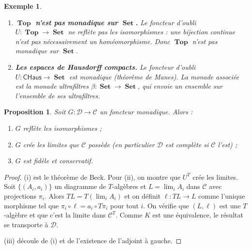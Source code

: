 \documentclass[a4paper,12pt]{book}
\DeclareMathOperator{\Set}{\mathbf{Set}}
\DeclareMathOperator{\Top}{\mathbf{Top}}
\newtheorem{proposition}[theoreme]{Proposition}
\newtheorem{exemple}[theoreme]{Exemple}
\begin{document}
\begin{exemple}\label{ex:non-monadique}
\begin{enumerate}[label=(\roman*)]
\item \textbf{$\Top$ n'est pas monadique sur $\Set$.}
    Le foncteur d'oubli $U \colon \Top \to \Set$ ne reflète pas
    les isomorphismes : une bijection continue n'est pas nécessairement
    un homéomorphisme. Donc $\Top$ n'est pas monadique sur $\Set$.

\item \textbf{Les espaces de Hausdorff compacts.}
    Le foncteur d'oubli $U \colon \mathsf{CHaus} \to \Set$
    est monadique (théorème de Manes).
    La monade associée est la monade ultrafiltres
    $\beta \colon \Set \to \Set$,
    qui envoie un ensemble sur l'ensemble de ses ultrafiltres.
\end{enumerate}
\end{exemple}

\begin{proposition}\label{prop:monadique-proprietes}
Soit $G \colon \mathcal{D} \to \mathcal{C}$ un foncteur monadique.
Alors :
\begin{enumerate}[label=(\roman*)]
\item $G$ reflète les isomorphismes ;
\item $G$ crée les limites que $\mathcal{C}$ possède
    (en particulier $\mathcal{D}$ est complète si $\mathcal{C}$ l'est) ;
\item $G$ est fidèle et conservatif.
\end{enumerate}
\end{proposition}

\begin{proof}
(i) est le théorème de Beck. Pour (ii), on montre que $U^T$ crée
les limites. Soit $\{(A_i, a_i)\}$ un diagramme de $T$-algèbres et
$L = \lim_i A_i$ dans $\mathcal{C}$ avec projections $\pi_i$.
Alors $TL = T(\lim_i A_i)$ et on définit $\ell \colon TL \to L$
comme l'unique morphisme tel que $\pi_i \circ \ell = a_i \circ T\pi_i$
pour tout $i$. On vérifie que $(L, \ell)$ est une $T$-algèbre et
que c'est la limite dans $\mathcal{C}^T$. Comme $K$ est une équivalence,
le résultat se transporte à $\mathcal{D}$.

(iii) découle de (i) et de l'existence de l'adjoint à gauche.
\end{proof}
\end{document}
